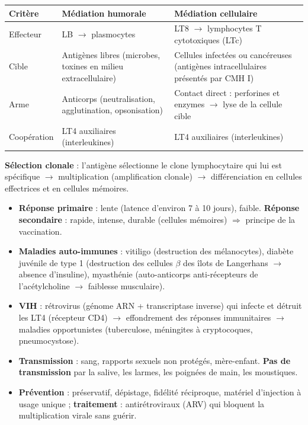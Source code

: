 \documentclass[11pt]{article}
\newcommand{\cle}[1]{{\popxbold\color{popdark}#1}}
\begin{document}
\begin{propriete}
\begin{center}
\begin{tabularx}{\linewidth}{|l|X|X|}
\hline
\rowcolor{popblueL} \textbf{Critère} & \textbf{Médiation humorale} & \textbf{Médiation cellulaire} \\
\hline
Effecteur & LB $\to$ plasmocytes & LT8 $\to$ lymphocytes T cytotoxiques (LTc) \\
\hline
Cible & Antigènes libres (microbes, toxines en milieu extracellulaire) & Cellules infectées ou cancéreuses (antigènes intracellulaires présentés par CMH I) \\
\hline
Arme & Anticorps (neutralisation, agglutination, opsonisation) & Contact direct : perforines et enzymes $\to$ lyse de la cellule cible \\
\hline
Coopération & LT4 auxiliaires (interleukines) & LT4 auxiliaires (interleukines) \\
\hline
\end{tabularx}
\end{center}
\textbf{Sélection clonale} : l'antigène sélectionne le clone lymphocytaire qui lui est spécifique $\to$ multiplication (amplification clonale) $\to$ différenciation en cellules effectrices et en \cle{cellules mémoires}.
\end{propriete}

\begin{aretenir}
\begin{itemize}
\item \textbf{Réponse primaire} : lente (latence d'environ 7 à 10 jours), faible. \textbf{Réponse secondaire} : rapide, intense, durable (cellules mémoires) $\Rightarrow$ principe de la \cle{vaccination}.
\item \textbf{Maladies auto-immunes} : vitiligo (destruction des mélanocytes), diabète juvénile de type 1 (destruction des cellules $\beta$ des îlots de Langerhans $\to$ absence d'insuline), myasthénie (auto-anticorps anti-récepteurs de l'acétylcholine $\to$ faiblesse musculaire).
\item \textbf{VIH} : rétrovirus (génome ARN + transcriptase inverse) qui infecte et détruit les \cle{LT4} (récepteur CD4) $\to$ effondrement des réponses immunitaires $\to$ maladies opportunistes (tuberculose, méningites à cryptocoques, pneumocystose).
\item \textbf{Transmission} : sang, rapports sexuels non protégés, mère-enfant. \textbf{Pas de transmission} par la salive, les larmes, les poignées de main, les moustiques.
\item \textbf{Prévention} : préservatif, dépistage, fidélité réciproque, matériel d'injection à usage unique ; \textbf{traitement} : antirétroviraux (ARV) qui bloquent la multiplication virale sans guérir.
\end{itemize}
\end{aretenir}
\end{document}
